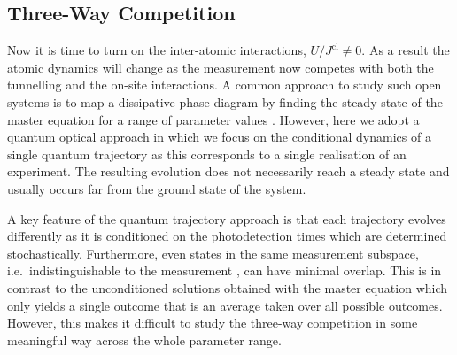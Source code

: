 \subsection{Three-Way Competition}

Now it is time to turn on the inter-atomic interactions,
$U/J^\mathrm{cl} \ne 0$. As a result the atomic dynamics will change
as the measurement now competes with both the tunnelling and the
on-site interactions. A common approach to study such open systems is
to map a dissipative phase diagram by finding the steady state of the
master equation for a range of parameter values
\cite{kessler2012}. However, here we adopt a quantum optical approach
in which we focus on the conditional dynamics of a single quantum
trajectory as this corresponds to a single realisation of an
experiment. The resulting evolution does not necessarily reach a
steady state and usually occurs far from the ground state of the
system.

A key feature of the quantum trajectory approach is that each
trajectory evolves differently as it is conditioned on the
photodetection times which are determined stochastically. Furthermore,
even states in the same measurement subspace, i.e.~indistinguishable
to the measurement , can have minimal overlap. This is in contrast to
the unconditioned solutions obtained with the master equation which
only yields a single outcome that is an average taken over all
possible outcomes. However, this makes it difficult to study the
three-way competition in some meaningful way across the whole
parameter range.

